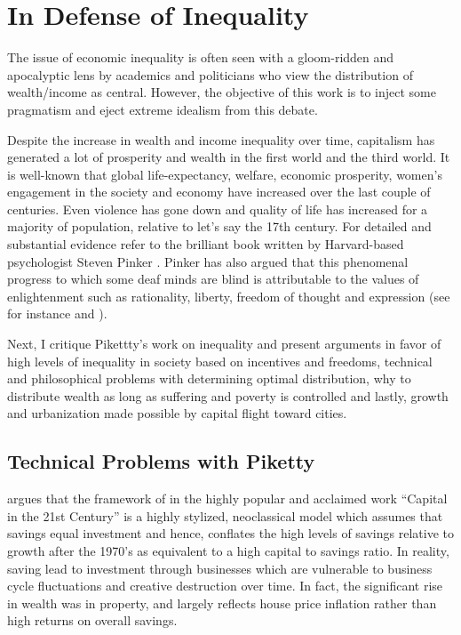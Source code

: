 \documentclass[12pt]{article}
\newcommand{\1}{\mathbbm 1}
\begin{document}
			
		
		
		\section{In Defense of Inequality}
		
		
		The issue of economic inequality is often seen with a gloom-ridden and apocalyptic lens by academics and politicians who view the distribution of wealth/income as central. However, the objective of this work is to inject some pragmatism and eject extreme idealism from this debate.
		
		Despite the increase in wealth and income inequality over time, capitalism has generated a lot of prosperity and wealth in the first world and the third world. It is well-known that global life-expectancy, welfare, economic prosperity, women's engagement in the society and economy have increased over the last couple of centuries. Even violence has gone down and quality of life has increased for a majority of population, relative to let's say the 17th century. For detailed and substantial evidence refer to the brilliant book written by Harvard-based psychologist Steven Pinker \cite{pinker2011better}. Pinker has also argued that this phenomenal progress to which some deaf minds are blind is attributable to the values of enlightenment such as rationality, liberty, freedom of thought and expression (see for instance \cite{pinker2018enlightenment} and \cite{pinker2022rationality}).
		
	    Next, I critique Pikettty's work on inequality and present arguments in favor of high levels of inequality in society based on incentives and freedoms, technical and philosophical problems with determining optimal distribution, why to distribute wealth as long as suffering and poverty is controlled and lastly, growth and urbanization made possible by capital flight toward cities.
	
		
		
		
		\subsection{Technical Problems with Piketty} 
		
		
		\cite{soskice2014capital} argues that the framework of \cite{piketty2017capital} in the highly popular and acclaimed work ``Capital in the 21st Century'' is a highly stylized, neoclassical model which assumes that savings equal investment and hence, conflates the high levels of savings relative to growth after the 1970's as equivalent to a high capital to savings ratio. In reality, saving lead to investment through businesses which are vulnerable to business cycle fluctuations and creative destruction over time. In fact, the significant rise in wealth was in property, and largely reflects house price inflation \cite{bonnet2014does} rather than high returns on overall savings.
		
\end{document}
